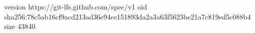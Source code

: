 version https://git-lfs.github.com/spec/v1
oid sha256:78c5ab16cf9acd213ad36e94ce151893da2a3a63f5623be21a7c819ed5c088b4
size 43840
